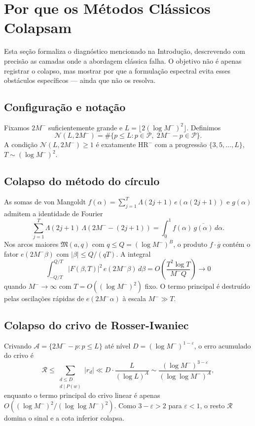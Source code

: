 \documentclass[12pt,a4paper]{article}
\theoremstyle{definition}
\newcommand{\PP}{\mathcal{P}}          %
\newcommand{\HRm}{\mathrm{HR}^{-}}
\begin{document}
	\section{Por que os Métodos Clássicos Colapsam}
	\label{sec:crivo}
	
	Esta seção formaliza o diagnóstico mencionado na Introdução, descrevendo
	com precisão as camadas onde a abordagem clássica falha. O objetivo não é
	apenas registrar o colapso, mas mostrar por que a formulação espectral
	evita esses obstáculos específicos — ainda que não os resolva.
	
	\subsection{Configuração e notação}
	
	Fixamos $2M^-$ suficientemente grande e $L = \lfloor 2(\log M^-)^2 \rfloor$.
	Definimos
	\[
	\mathcal{N}(L, 2M^-) = \#\{p \leq L : p \in \PP,\; 2M^- - p \in \PP\}.
	\]
	A condição $\mathcal{N}(L, 2M^-) \geq 1$ é exatamente $\HRm$ com a
	progressão $\{3, 5, \ldots, L\}$, $T \sim (\log M^-)^2$.
	
	\subsection{Colapso do método do círculo}
	
	As somas de von Mangoldt $f(\alpha) = \sum_{j=1}^T \Lambda(2j+1)\,e(\alpha(2j+1))$
	e $g(\alpha)$ admitem a identidade de Fourier
	\[
	\sum_{j=1}^T \Lambda(2j+1)\,\Lambda(2M^- - (2j+1)) = \int_0^1 f(\alpha)\,\overline{g(\alpha)}\,d\alpha.
	\]
	Nos arcos maiores $\mathfrak{M}(a,q)$ com $q \leq Q = (\log M^-)^B$, o
	produto $f\cdot\overline{g}$ contém o fator $e(2M^-\beta)$ com
	$|\beta| \leq Q/(qT)$. A integral
	\[
	\int_{-Q/T}^{Q/T}|F(\beta,T)|^2\,e(2M^-\beta)\,d\beta
	= O\!\left(\frac{T^2\log T}{M^{-}Q}\right) \to 0
	\]
	quando $M^- \to \infty$ com $T = O((\log M^-)^2)$ fixo. O termo
	principal é destruído pelas oscilações rápidas de $e(2M^-\alpha)$
	à escala $M^- \gg T$.
	
	\subsection{Colapso do crivo de Rosser-Iwaniec}
	
	Crivando $\mathcal{A} = \{2M^- - p : p \leq L\}$ até nível
	$D = (\log M^-)^{1-\varepsilon}$, o erro acumulado do crivo é
	\[
	\mathcal{R} \leq \sum_{\substack{d \leq D \\ d \mid P(w)}} |r_d|
	\ll D \cdot \frac{L}{(\log L)^A}
	\sim \frac{(\log M^-)^{3-\varepsilon}}{(\log\log M^-)^A},
	\]
	enquanto o termo principal do crivo linear é apenas
	$O((\log M^-)^2/(\log\log M^-)^2)$. Como $3 - \varepsilon > 2$ para
	$\varepsilon < 1$, o resto $\mathcal{R}$ domina o sinal e a cota
	inferior colapsa.
	
\end{document}
